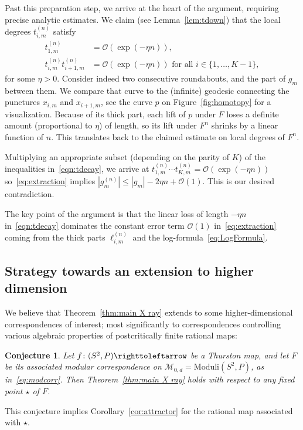 \documentclass{amsart}
\newcommand{\Moduli}{\text{Moduli}}
\newtheorem{mainconj}[mainthm]{Conjecture}
\theoremstyle{definition}
\theoremstyle{remark}
\begin{document}
Past this preparation step, we arrive at the heart of the argument, requiring precise analytic estimates. We claim (see Lemma~\ref{lem:tdown}) that the local degrees $t_{i,m}^{(n)}$ satisfy
\begin{equation}\label{eqn:tdecay}
  \begin{aligned}
    t^{(n)}_{1,m}&=\mathcal O(\exp(-\eta n)),\\
    t^{(n)}_{i,m}t^{(n)}_{i+1,m}&=\mathcal O(\exp(-\eta n))\text{ for all }i\in\{1,\dots,K-1\},
  \end{aligned}
\end{equation}
for some $\eta>0$. Consider indeed two consecutive roundabouts, and the part of $g_m$ between them. We compare that curve to the (infinite) geodesic connecting the punctures $x_{i,m}$ and $x_{i+1,m}$, see the curve $p$ on Figure~\ref{fig:homotopy} for a visualization. Because of its thick part, each lift of $p$ under $F$ loses a definite amount (proportional to $\eta$) of length, so its lift under $F^n$ shrinks by a linear function of $n$. This translates back to the claimed estimate on local degrees of $F^n$.

Multiplying an appropriate subset (depending on the parity of $K$) of the inequalities in~\eqref{eqn:tdecay}, we arrive at $t^{(n)}_{1,m}\cdots t^{(n)}_{K,m}=\mathcal O(\exp(-\eta n))$ so~\eqref{eq:extraction} implies $|g_m^{(n)}|\le |g_m| - 2\eta n + \mathcal O(1)$. This is our desired contradiction.

The key point of the argument is that the linear loss of length $-\eta n$ in~\eqref{eqn:tdecay} dominates the constant error term $\mathcal O(1)$ in~\eqref{eq:extraction} coming from the thick parts $\ell_{i,m}^{(n)}$ and the log-formula~\eqref{eq:LogFormula}.


\subsection{Strategy towards an extension to higher dimension}\label{ss:higher dimension}
We believe that Theorem~\ref{thm:main X ray} extends to some higher-dimensional correspondences of interest; most significantly to correspondences controlling various algebraic properties of postcritically finite rational maps:
\begin{mainconj}\label{conj:main}
  Let $f\colon(S^2,P)\righttoleftarrow$ be a Thurston map, and let $F$ be its associated modular correspondence on $\mathscr M_{0,d}=\Moduli(S^2, P)$, as in~\eqref{eq:modcorr}. Then Theorem~\ref{thm:main X ray} holds with respect to any fixed point $\star$ of $F$.
\end{mainconj}
This conjecture implies Corollary~\ref{cor:attractor} for the rational map associated with $\star$.
\end{document}

